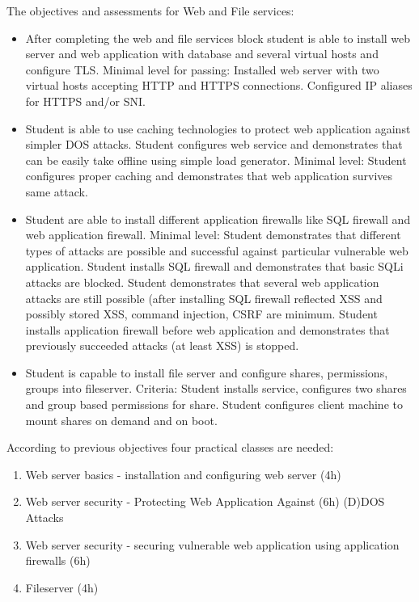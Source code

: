The objectives and assessments for Web and File services:
\begin{itemize}
\item After completing the web and file services block student is able to install web server and web application with database and several virtual hosts and configure \gls{TLS}. Minimal level for passing: Installed web server with two virtual hosts accepting \gls{HTTP} and \gls{HTTPS} connections. Configured IP aliases for \gls{HTTPS} and/or \gls{SNI}.
\item Student is able to use caching technologies to protect web application against simpler \gls{DOS} attacks. Student configures web service and demonstrates that can be easily take offline using simple load generator. Minimal level: Student configures proper caching and demonstrates that web application survives same attack.
\item Student are able to install different application firewalls like \gls{SQL} firewall and web application firewall. Minimal level: Student demonstrates that different types of attacks are possible and successful against particular vulnerable web application. Student installs \gls{SQL} firewall and demonstrates that basic \gls{SQLi} attacks are blocked. Student demonstrates that several web application attacks are still possible (after installing \gls{SQL} firewall reflected \gls{XSS} and possibly stored \gls{XSS}, command injection, \gls{CSRF} are minimum. Student installs application firewall before web application and demonstrates that previously succeeded attacks (at least \gls{XSS}) is stopped.
\item Student is capable to install file server and configure shares, permissions, groups into fileserver. Criteria: Student installs service, configures two shares and group based permissions for share. Student configures client machine to mount shares on demand and on boot.
\end{itemize}


According to previous objectives four practical classes are needed:
\begin{enumerate}[label=LAB \arabic*.,leftmargin=*]
   \item Web server basics - installation and configuring web server (4h)
  	\item Web server security - Protecting Web Application Against (6h)
(D)DOS Attacks
  	\item Web server security - securing vulnerable web application using application firewalls (6h)
  	\item Fileserver (4h)
\end{enumerate}


